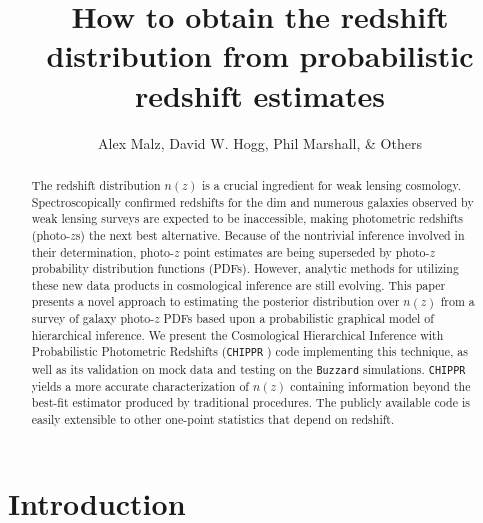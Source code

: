 \documentclass[iop]{emulateapj}
\newcommand{\chippr}{\texttt{CHIPPR} }
\begin{document}
\title{How to obtain the redshift distribution from probabilistic redshift estimates}

\author{Alex Malz, David W. Hogg, Phil Marshall, \& Others}


\begin{abstract}
The redshift distribution $n(z)$ is a crucial ingredient for weak lensing cosmology.  Spectroscopically confirmed redshifts for the dim and numerous galaxies observed by weak lensing surveys are expected to be inaccessible, making photometric redshifts (photo-$z$s) the next best alternative.  Because of the nontrivial inference involved in their determination, photo-$z$ point estimates are being superseded by photo-$z$ probability distribution functions (PDFs).  However, analytic methods for utilizing these new data products in cosmological inference are still evolving.  This paper presents a novel approach to estimating the posterior distribution over $n(z)$ from a survey of galaxy photo-$z$ PDFs based upon a probabilistic graphical model of hierarchical inference.  We present the Cosmological Hierarchical Inference with Probabilistic Photometric Redshifts (\chippr) code implementing this technique, as well as its validation on mock data and testing on the \texttt{Buzzard} simulations.  \chippr yields a more accurate characterization of $n(z)$ containing information beyond the best-fit estimator produced by traditional procedures.  The publicly available code is easily extensible to other one-point statistics that depend on redshift.

\end{abstract}


\section{Introduction}
\label{sec:introduction}
\end{document}
